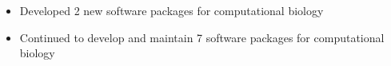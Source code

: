 \begin{itemize}
    \item Developed 2 new software packages for computational biology
    \item Continued to develop and maintain 7 software packages for computational biology
\end{itemize}
